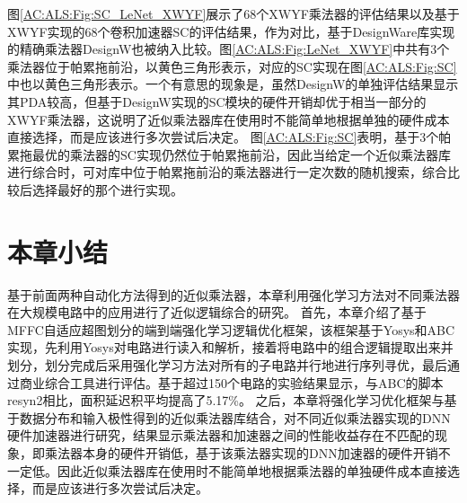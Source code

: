 图\ref{AC:ALS:Fig:SC_LeNet_XWYF}展示了68个XWYF乘法器的评估结果以及基于XWYF实现的68个卷积加速器SC\cite{Accelerator:SC}的评估结果，作为对比，基于DesignWare库\cite{IP:DesignWare}实现的精确乘法器DesignW也被纳入比较。图\ref{AC:ALS:Fig:LeNet_XWYF}中共有3个乘法器位于帕累拖前沿，以黄色三角形表示，对应的SC实现在图\ref{AC:ALS:Fig:SC}中也以黄色三角形表示。一个有意思的现象是，虽然DesignW的单独评估结果显示其PDA较高，但基于DesignW实现的SC模块的硬件开销却优于相当一部分的XWYF乘法器，这说明了近似乘法器库在使用时不能简单地根据单独的硬件成本直接选择，而是应该进行多次尝试后决定。
图\ref{AC:ALS:Fig:SC}表明，基于3个帕累拖最优的乘法器的SC实现仍然位于帕累拖前沿，因此当给定一个近似乘法器库进行综合时，可对库中位于帕累拖前沿的乘法器进行一定次数的随机搜索，综合比较后选择最好的那个进行实现。

\section{本章小结}

基于前面两种自动化方法得到的近似乘法器，本章利用强化学习方法对不同乘法器在大规模电路中的应用进行了近似逻辑综合的研究。
首先，本章介绍了基于MFFC自适应超图划分的端到端强化学习逻辑优化框架，该框架基于Yosys和ABC实现，先利用Yosys对电路进行读入和解析，接着将电路中的组合逻辑提取出来并划分，划分完成后采用强化学习方法对所有的子电路并行地进行序列寻优，最后通过商业综合工具进行评估。基于超过150个电路的实验结果显示，与ABC的脚本resyn2相比，面积延迟积平均提高了5.17\%。
之后，本章将强化学习优化框架与基于数据分布和输入极性得到的近似乘法器库结合，对不同近似乘法器实现的DNN硬件加速器进行研究，结果显示乘法器和加速器之间的性能收益存在不匹配的现象，即乘法器本身的硬件开销低，基于该乘法器实现的DNN加速器的硬件开销不一定低。因此近似乘法器库在使用时不能简单地根据乘法器的单独硬件成本直接选择，而是应该进行多次尝试后决定。